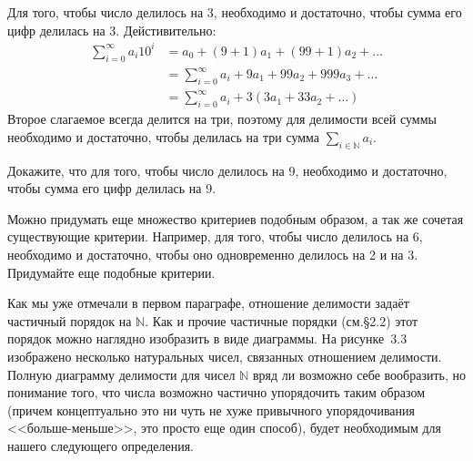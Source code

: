 \begin{example}
Для того, чтобы число делилось на 3, необходимо и достаточно, чтобы сумма его цифр делилась на 3. Дейстивительно:
\begin{align*}
\sum_{i=0}^\infty a_i 10^i &= a_0 + (9+1)a_1 + (99+1)a_2 + \ldots\\
    &= \sum_{i=0}^\infty a_i + 9a_1 + 99a_2 + 999a_3 +\ldots \\
    &= \sum_{i=0}^\infty a_i + 3(3a_1 + 33a_2 +\ldots)
\end{align*}
Второе слагаемое всегда делится на три, поэтому для делимости всей суммы необходимо и достаточно, чтобы делилась на три сумма $\sum_{i\in\mathbb{N}} a_i$.
\end{example}

\begin{exercise}
Докажите, что для того, чтобы число делилось на 9, необходимо и достаточно, чтобы сумма его цифр делилась на 9.
\end{exercise}

\begin{example}
Можно придумать еще множество критериев подобным образом, а так же сочетая существующие критерии. Например, для того, чтобы число делилось на 6, необходимо и достаточно, чтобы оно одновременно делилось на 2 и на 3. Придумайте еще подобные критерии.
\end{example}

Как мы уже отмечали в первом параграфе, отношение делимости задаёт частичный порядок на $\mathbb{N}$. Как и прочие частичные порядки (см.\S2.2) этот порядок можно наглядно изобразить в виде диаграммы. На рисунке~3.3 изображено несколько натуральных чисел, связанных отношением делимости. Полную диаграмму делимости для чисел $\mathbb{N}$ вряд ли возможно себе вообразить, но понимание того, что числа возможно частично упорядочить таким образом (причем концептуально это ни чуть не хуже привычного упорядочивания <<больше-меньше>>, это просто еще один способ), будет необходимым для нашего следующего определения.

